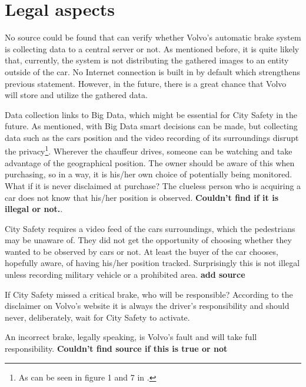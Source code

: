 \documentclass[conference]{IEEEtran}
\begin{document}

\section{Legal aspects}
No source could be found that can verify whether Volvo's automatic brake system is collecting data to a central server or not. As mentioned before, it is quite likely that, currently, the system is not distributing the gathered images to an entity outside of the car. No Internet connection is built in by default which strengthens previous statement. \cite{SensusConnect} However, in the future, there is a great chance that Volvo will store and utilize the gathered data.

Data collection links to Big Data, which might be essential for City Safety in the future. As mentioned, with Big Data smart decisions can be made, but collecting data such as the cars position and the video recording of its surroundings disrupt the privacy\footnote{As can be seen in figure 1 and 7 in \cite{SysDescription}.}.  Wherever the chauffeur drives, someone can be watching and take advantage of the geographical position. The owner should be aware of this when purchasing, so in a way, it is his/her own choice of potentially being monitored. What if it is never disclaimed at purchase? The clueless person who is acquiring a car does not know that his/her position is observed. \textbf{Couldn't find if it is illegal or not.}.

City Safety requires a video feed of the cars surroundings, which the pedestrians may be unaware of. They did not get the opportunity of choosing whether they wanted to be observed by cars or not. At least the buyer of the car chooses, hopefully aware, of having his/her position tracked. Surprisingly this is not illegal unless recording military vehicle or a prohibited area. \textbf{add source}

If City Safety missed a critical brake, who will be responsible? According to the disclaimer on Volvo's website it is always the driver's responsibility and should never, deliberately, wait for City Safety to activate. \cite{CitySafetyLegal}

An incorrect brake, legally speaking, is Volvo's fault and will take full responsibility. \textbf{Couldn't find source if this is true or not}
\end{document}
